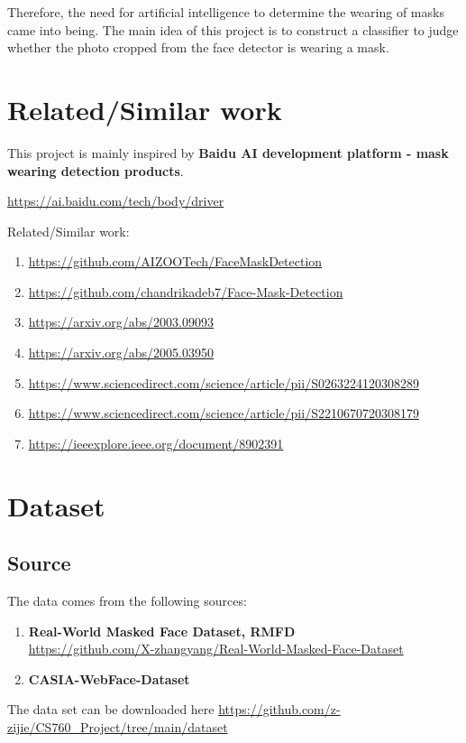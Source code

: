 \documentclass{article}
\begin{document}
Therefore, the need for artificial intelligence to determine the wearing of masks came into being. The main idea of this project is to construct a classifier to judge whether the photo cropped from the face detector is wearing a mask.

\section{Related/Similar work}
This project is mainly inspired by \textbf{Baidu AI development platform - mask wearing detection products}.

\url{https://ai.baidu.com/tech/body/driver}


Related/Similar work:
\begin{enumerate}
  \item \url{https://github.com/AIZOOTech/FaceMaskDetection}
  \item \url{https://github.com/chandrikadeb7/Face-Mask-Detection}
  \item \url{https://arxiv.org/abs/2003.09093}\cite{wang2020masked}
  \item \url{https://arxiv.org/abs/2005.03950}\cite{jiang2020retinamask}
  \item \url{https://www.sciencedirect.com/science/article/pii/S0263224120308289}\cite{LOEY2021108288}
  \item \url{https://www.sciencedirect.com/science/article/pii/S2210670720308179}\cite{LOEY2020102600}
  \item \url{https://ieeexplore.ieee.org/document/8902391}\cite{8902391}
\end{enumerate}

\section{Dataset}

  \subsection{Source}
  The data comes from the following sources:
  \begin{enumerate}
    \item \textbf{Real-World Masked Face Dataset, RMFD}\\
          \url{https://github.com/X-zhangyang/Real-World-Masked-Face-Dataset}
    \item \textbf{CASIA-WebFace-Dataset}
  \end{enumerate}
  The data set can be downloaded here \url{https://github.com/z-zijie/CS760_Project/tree/main/dataset}
\end{document}
